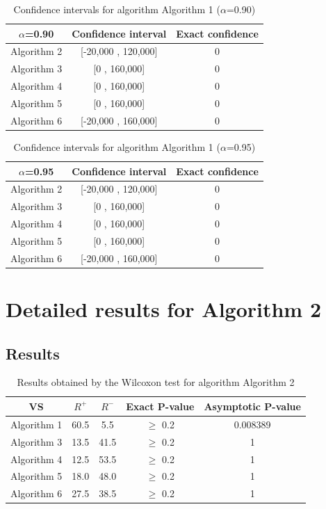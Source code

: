 \documentclass[a4paper,10pt]{article}
\begin{document}
\begin{table}[!htp]
\centering\small
\begin{tabular}{
|c|c|c|}
\hline
 $\alpha$=0.90 & Confidence interval & Exact confidence \\ \hline 
Algorithm 2 & [-20,000 , 120,000] & 0\\ \hline 
Algorithm 3 & [0 , 160,000] & 0\\ \hline 
Algorithm 4 & [0 , 160,000] & 0\\ \hline 
Algorithm 5 & [0 , 160,000] & 0\\ \hline 
Algorithm 6 & [-20,000 , 160,000] & 0\\ \hline 

\end{tabular}
\caption{Confidence intervals for algorithm Algorithm 1 ($\alpha$=0.90)}
\end{table}
\begin{table}[!htp]
\centering\small
\begin{tabular}{
|c|c|c|}
\hline
 $\alpha$=0.95 & Confidence interval & Exact confidence \\ \hline 
Algorithm 2 & [-20,000 , 120,000] & 0\\ \hline 
Algorithm 3 & [0 , 160,000] & 0\\ \hline 
Algorithm 4 & [0 , 160,000] & 0\\ \hline 
Algorithm 5 & [0 , 160,000] & 0\\ \hline 
Algorithm 6 & [-20,000 , 160,000] & 0\\ \hline 

\end{tabular}
\caption{Confidence intervals for algorithm Algorithm 1 ($\alpha$=0.95)}
\end{table}

 \clearpage 


\section{Detailed results for Algorithm 2}


\subsection{Results}

\begin{table}[!htp]
\centering\small
\begin{tabular}{
|c|c|c|c|c|}
\hline
 VS & $R^{+}$ & $R^{-}$ & Exact P-value & Asymptotic P-value \\ \hline 
Algorithm 1 & 60.5 & 5.5 & $\geq$ 0.2 & 0.008389\\ \hline 
Algorithm 3 & 13.5 & 41.5 & $\geq$ 0.2 & 1\\ \hline 
Algorithm 4 & 12.5 & 53.5 & $\geq$ 0.2 & 1\\ \hline 
Algorithm 5 & 18.0 & 48.0 & $\geq$ 0.2 & 1\\ \hline 
Algorithm 6 & 27.5 & 38.5 & $\geq$ 0.2 & 1\\ \hline 

\end{tabular}
\caption{Results obtained by the Wilcoxon test for algorithm Algorithm 2}
\end{table}
\end{document}

